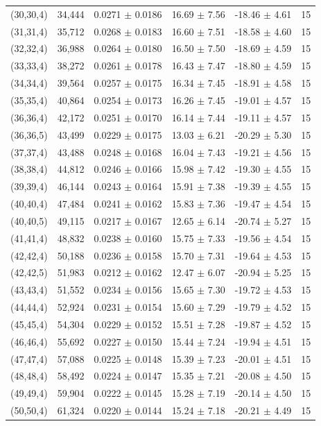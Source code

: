 \begin{tabular}{@{}l r c c c r@{}}
(30,30,4) & 34,444 & 0.0271 $\pm$ 0.0186 & 16.69 $\pm$ 7.56 & -18.46 $\pm$ 4.61 & 15\\
(31,31,4) & 35,712 & 0.0268 $\pm$ 0.0183 & 16.60 $\pm$ 7.51 & -18.58 $\pm$ 4.60 & 15\\
(32,32,4) & 36,988 & 0.0264 $\pm$ 0.0180 & 16.50 $\pm$ 7.50 & -18.69 $\pm$ 4.59 & 15\\
(33,33,4) & 38,272 & 0.0261 $\pm$ 0.0178 & 16.43 $\pm$ 7.47 & -18.80 $\pm$ 4.59 & 15\\
(34,34,4) & 39,564 & 0.0257 $\pm$ 0.0175 & 16.34 $\pm$ 7.45 & -18.91 $\pm$ 4.58 & 15\\
(35,35,4) & 40,864 & 0.0254 $\pm$ 0.0173 & 16.26 $\pm$ 7.45 & -19.01 $\pm$ 4.57 & 15\\
(36,36,4) & 42,172 & 0.0251 $\pm$ 0.0170 & 16.14 $\pm$ 7.44 & -19.11 $\pm$ 4.57 & 15\\
(36,36,5) & 43,499 & 0.0229 $\pm$ 0.0175 & 13.03 $\pm$ 6.21 & -20.29 $\pm$ 5.30 & 15\\
(37,37,4) & 43,488 & 0.0248 $\pm$ 0.0168 & 16.04 $\pm$ 7.43 & -19.21 $\pm$ 4.56 & 15\\
(38,38,4) & 44,812 & 0.0246 $\pm$ 0.0166 & 15.98 $\pm$ 7.42 & -19.30 $\pm$ 4.55 & 15\\
(39,39,4) & 46,144 & 0.0243 $\pm$ 0.0164 & 15.91 $\pm$ 7.38 & -19.39 $\pm$ 4.55 & 15\\
(40,40,4) & 47,484 & 0.0241 $\pm$ 0.0162 & 15.83 $\pm$ 7.36 & -19.47 $\pm$ 4.54 & 15\\
(40,40,5) & 49,115 & 0.0217 $\pm$ 0.0167 & 12.65 $\pm$ 6.14 & -20.74 $\pm$ 5.27 & 15\\
(41,41,4) & 48,832 & 0.0238 $\pm$ 0.0160 & 15.75 $\pm$ 7.33 & -19.56 $\pm$ 4.54 & 15\\
(42,42,4) & 50,188 & 0.0236 $\pm$ 0.0158 & 15.70 $\pm$ 7.31 & -19.64 $\pm$ 4.53 & 15\\
(42,42,5) & 51,983 & 0.0212 $\pm$ 0.0162 & 12.47 $\pm$ 6.07 & -20.94 $\pm$ 5.25 & 15\\
(43,43,4) & 51,552 & 0.0234 $\pm$ 0.0156 & 15.65 $\pm$ 7.30 & -19.72 $\pm$ 4.53 & 15\\
(44,44,4) & 52,924 & 0.0231 $\pm$ 0.0154 & 15.60 $\pm$ 7.29 & -19.79 $\pm$ 4.52 & 15\\
(45,45,4) & 54,304 & 0.0229 $\pm$ 0.0152 & 15.51 $\pm$ 7.28 & -19.87 $\pm$ 4.52 & 15\\
(46,46,4) & 55,692 & 0.0227 $\pm$ 0.0150 & 15.44 $\pm$ 7.24 & -19.94 $\pm$ 4.51 & 15\\
(47,47,4) & 57,088 & 0.0225 $\pm$ 0.0148 & 15.39 $\pm$ 7.23 & -20.01 $\pm$ 4.51 & 15\\
(48,48,4) & 58,492 & 0.0224 $\pm$ 0.0147 & 15.35 $\pm$ 7.21 & -20.08 $\pm$ 4.50 & 15\\
(49,49,4) & 59,904 & 0.0222 $\pm$ 0.0145 & 15.28 $\pm$ 7.19 & -20.14 $\pm$ 4.50 & 15\\
(50,50,4) & 61,324 & 0.0220 $\pm$ 0.0144 & 15.24 $\pm$ 7.18 & -20.21 $\pm$ 4.49 & 15\\
\bottomrule
\end{tabular}
